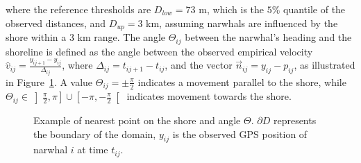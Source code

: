 \documentclass[aoas]{imsart}
\theoremstyle{definition}
\theoremstyle{remark}
\theoremstyle{remark}
\newcommand {\1}{\mathbb{1}}
\begin{document}
where the reference thresholds are $D_{low}=73$ m, which is the $5\%$ quantile of the observed distances, and $D_{up}=3$ km, assuming narwhals are influenced by the shore within a $3$ km range. 
The angle $\Theta_{ij}$ between the narwhal's heading and the shoreline is defined as the angle between the observed empirical velocity $\hat{v}_{ij}=\frac{y_{ij+1}-y_{ij}}{\Delta_{ij}}$, where $\Delta_{ij}=t_{ij+1}-t_{ij}$, and the vector $\vec{n}_{ij}=y_{ij}-p_{ij}$, as illustrated in Figure~\ref{fig: illustration nearest shore points}. A value $\Theta_{ij}=\pm \frac{\pi}{2}$ indicates a movement parallel to the shore, while $\Theta_{ij} \in \left]\frac{\pi}{2},\pi\right] \cup \left[-\pi,-\frac{\pi}{2}\right[$ indicates movement towards the shore. 


\begin{figure}[ht!]
	\centering
	\caption{Example of nearest point on the shore and angle $\Theta$. $\partial D$ represents the boundary of the domain, $y_{ij}$ is the observed GPS position of narwhal $i$ at time $t_{ij}$.}
	\label{fig: illustration nearest shore points}
\end{figure}
\end{document}
